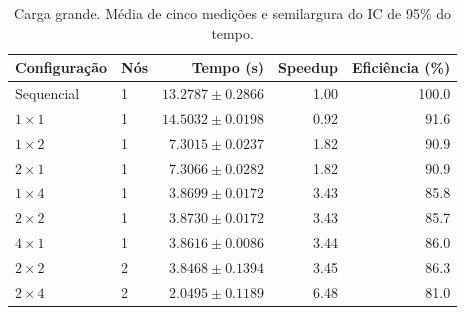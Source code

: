 \begin{table}[htbp]
\centering
\caption{Carga grande. Média de cinco medições e semilargura do IC de 95\% do tempo.}
\label{tab:lasdpc-grande}
\begin{tabular}{llrrr}
\toprule
Configuração & Nós & Tempo (s) & Speedup & Eficiência (\%) \\
\midrule
Sequencial & 1 & $13.2787 \pm 0.2866$ & 1.00 & 100.0 \\
$1 \times 1$ & 1 & $14.5032 \pm 0.0198$ & 0.92 & 91.6 \\
$1 \times 2$ & 1 & $7.3015 \pm 0.0237$ & 1.82 & 90.9 \\
$2 \times 1$ & 1 & $7.3066 \pm 0.0282$ & 1.82 & 90.9 \\
$1 \times 4$ & 1 & $3.8699 \pm 0.0172$ & 3.43 & 85.8 \\
$2 \times 2$ & 1 & $3.8730 \pm 0.0172$ & 3.43 & 85.7 \\
$4 \times 1$ & 1 & $3.8616 \pm 0.0086$ & 3.44 & 86.0 \\
$2 \times 2$ & 2 & $3.8468 \pm 0.1394$ & 3.45 & 86.3 \\
$2 \times 4$ & 2 & $2.0495 \pm 0.1189$ & 6.48 & 81.0 \\
\bottomrule
\end{tabular}
\end{table}
